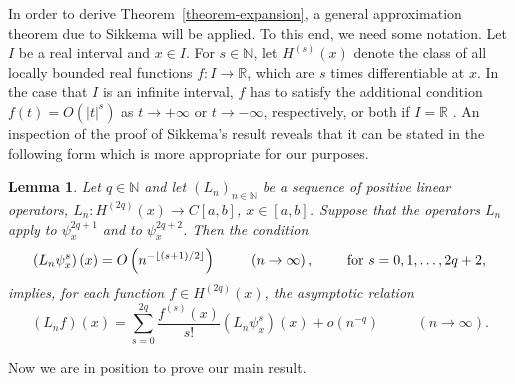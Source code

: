\documentclass[11pt,a4paper]{article}
\newtheorem{lemma}[theorem]{Lemma}
\begin{document}
In order to derive Theorem~\ref{theorem-expansion}, a general approximation
theorem due to Sikkema \cite[Theorem~3]{Sikkema1970a} will be applied. To
this end, we need some notation. Let $I$ be a real interval and $x\in I$.
For $s\in \mathbb{N}$, let $H^{\left( s\right) }\left( x\right) $ denote the
class of all locally bounded real functions $f:I\rightarrow \mathbb{R}$,
which are $s$ times differentiable at $x$. In the case that $I$ is an
infinite interval, $f$ has to satisfy the additional condition $f\left(
t\right) =O\left( \left\vert t\right\vert ^{s}\right) $ as $t\rightarrow
+\infty $ or $t\rightarrow -\infty $, respectively, or both if $I=\mathbb{R}$%
. An inspection of the proof of Sikkema's result reveals that it can be
stated in the following form which is more appropriate for our purposes.

\begin{lemma}
\label{Lemma-Sikkema}Let $q\in \mathbb{N}$ and let $\left( L_{n}\right)
_{n\in \mathbb{N}}$ be a sequence of positive linear operators, $%
L_{n}:H^{\left( 2q\right) }\left( x\right) \rightarrow C\left[ a,b\right] $, 
$x\in \left[ a,b\right] $. Suppose that the operators $L_{n}$ apply to $\psi
_{x}^{2q+1}$ and to $\psi _{x}^{2q+2}$. Then the condition 
\begin{equation*}
\left( L_{n}\psi _{x}^{s}\right) \left( x\right) =O\left( n^{-\left \lfloor
\left( s+1\right) /2\right \rfloor }\right) \text{ \qquad }\left(
n\rightarrow \infty \right) ,\text{ \qquad for }s=0,1,\ldots ,2q+2,
\end{equation*}%
implies, for each function $f\in H^{\left( 2q\right) }\left( x\right) $, the
asymptotic relation 
\begin{equation*}
\left( L_{n}f\right) \left( x\right) =\sum_{s=0}^{2q}\frac{f^{\left(
s\right) }\left( x\right) }{s!}\left( L_{n}\psi _{x}^{s}\right) \left(
x\right) +o\left( n^{-q}\right) \text{ }\qquad \left( n\rightarrow \infty
\right) .
\end{equation*}
\end{lemma}

Now we are in position to prove our main result.
\end{document}
